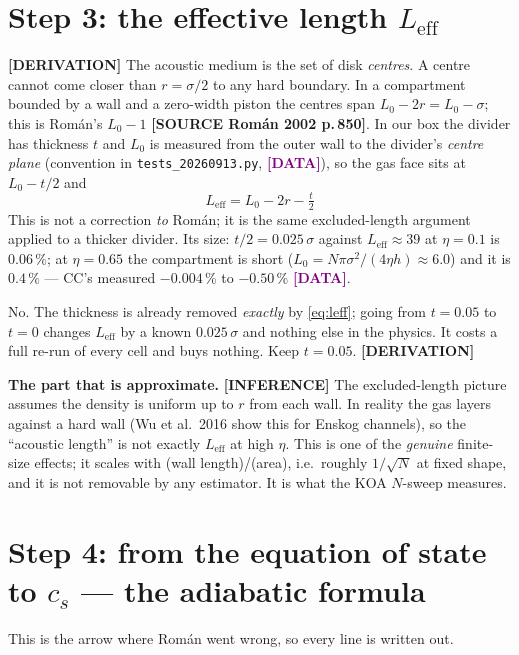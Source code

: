 \documentclass[11pt,a4paper]{article}
\newcommand{\Leff}{L_{\mathrm{eff}}}
\newcommand{\src}[1]{\textcolor{OliveGreen}{\textbf{[SOURCE #1]}}}
\newcommand{\der}{\textcolor{NavyBlue}{\textbf{[DERIVATION]}}}
\newcommand{\infr}{\textcolor{BurntOrange}{\textbf{[INFERENCE]}}}
\newcommand{\dat}{\textcolor{Purple}{\textbf{[DATA]}}}
\begin{document}
\section{Step 3: the effective length $\Leff$}
\label{sec:leff}
\der{} The acoustic medium is the set of disk \emph{centres}. A centre cannot come closer than $r = \sigma/2$ to any hard boundary. In a compartment bounded by a wall and a zero-width piston the centres span $L_0 - 2r = L_0 - \sigma$; this is Rom\'an's $L_0 - 1$ \src{Rom\'an 2002 p.\,850}. In our box the divider has thickness $t$ and $L_0$ is measured from the outer wall to the divider's \emph{centre plane} (convention in \texttt{tests\_20260913.py}, \dat{}), so the gas face sits at $L_0 - t/2$ and
\begin{equation}
\boxed{\;\Leff = L_0 - 2r - \tfrac{t}{2}\;}
\label{eq:leff}
\end{equation}
This is not a correction \emph{to} Rom\'an; it is the same excluded-length argument applied to a thicker divider. Its size: $t/2 = 0.025\,\sigma$ against $\Leff \approx 39$ at $\eta = 0.1$ is $0.06\,\%$; at $\eta = 0.65$ the compartment is short ($L_0 = N\pi\sigma^2/(4\eta h) \approx 6.0$) and it is $0.4\,\%$ --- CC's measured $-0.004\,\%$ to $-0.50\,\%$ \dat{}.

\begin{chk}
No. The thickness is already removed \emph{exactly} by \eqref{eq:leff}; going from $t = 0.05$ to $t = 0$ changes $\Leff$ by a known $0.025\,\sigma$ and nothing else in the physics. It costs a full re-run of every cell and buys nothing. Keep $t = 0.05$. \der{}
\end{chk}

\textbf{The part that is approximate.} \infr{} The excluded-length picture assumes the density is uniform up to $r$ from each wall. In reality the gas layers against a hard wall (Wu et al.\ 2016 show this for Enskog channels), so the ``acoustic length'' is not exactly $\Leff$ at high $\eta$. This is one of the \emph{genuine} finite-size effects; it scales with (wall length)/(area), i.e.\ roughly $1/\sqrt N$ at fixed shape, and it is not removable by any estimator. It is what the KOA $N$-sweep measures.

\section{Step 4: from the equation of state to $c_s$ --- the adiabatic formula}
\label{sec:cs}
This is the arrow where Rom\'an went wrong, so every line is written out.
\end{document}
